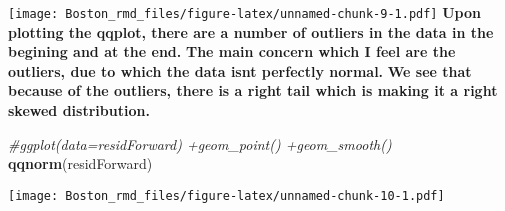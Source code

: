 \documentclass[]{article}
\newenvironment{Shaded}{\begin{snugshade}}{\end{snugshade}}
\newcommand{\CommentTok}[1]{\textcolor[rgb]{0.56,0.35,0.01}{\textit{#1}}}
\newcommand{\KeywordTok}[1]{\textcolor[rgb]{0.13,0.29,0.53}{\textbf{#1}}}
\newcommand{\NormalTok}[1]{#1}
\begin{document}
\texttt{[image: Boston\_rmd\_files/figure-latex/unnamed-chunk-9-1.pdf]}
\textbf{Upon plotting the qqplot, there are a number of outliers in the
data in the begining and at the end.} \textbf{The main concern which I
feel are the outliers, due to which the data isnt perfectly normal. }
\textbf{We see that because of the outliers, there is a right tail which
is making it a right skewed distribution.}

\begin{Shaded}
\begin{Highlighting}[]
\CommentTok{#ggplot(data=residForward) +geom_point() +geom_smooth()}
\KeywordTok{qqnorm}\NormalTok{(residForward)}
\end{Highlighting}
\end{Shaded}

\texttt{[image: Boston\_rmd\_files/figure-latex/unnamed-chunk-10-1.pdf]}

\eenum
\end{document}
